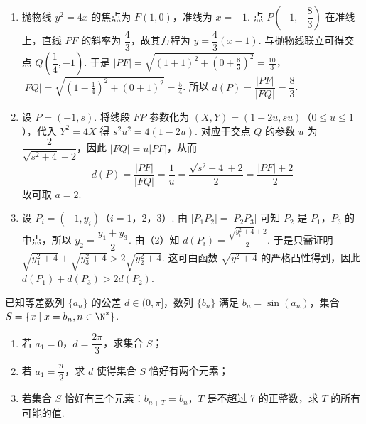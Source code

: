 \begin{solution}
\begin{enumerate}
\item 抛物线 \(y^2=4x\) 的焦点为 \(F(1,0)\)，准线为 \(x=-1\). 点 \(P\left(-1,-\dfrac83\right)\) 在准线上，直线 \(PF\) 的斜率为 \(\dfrac43\)，故其方程为 \(y=\dfrac43(x-1)\). 与抛物线联立可得交点 \(Q\left(\dfrac14,-1\right)\). 于是
\(|PF|=\sqrt{(1+1)^2+\left(0+\frac83\right)^2}=\frac{10}{3}\)，\(|FQ|=\sqrt{\left(1-\frac14\right)^2+(0+1)^2}=\frac54\).
所以 \(d(P)=\dfrac{|PF|}{|FQ|}=\dfrac83\).

\item 设 \(P=(-1,s)\). 将线段 \(FP\) 参数化为 \((X,Y)=(1-2u,su)\)（\(0\le u\le1\)），代入 \(Y^2=4X\) 得
\(s^2u^2=4(1-2u)\).
对应于交点 \(Q\) 的参数 \(u\) 为 \(\dfrac{2}{\sqrt{s^2+4}+2}\)，因此 \(|FQ|=u|PF|\)，从而
\[
d(P)=\frac{|PF|}{|FQ|}=\frac{1}{u}=\frac{\sqrt{s^2+4}+2}{2}=\frac{|PF|+2}{2}
\]
故可取 \(a=2\).

\item 设 \(P_i=(-1,y_i)\)（\(i=1\)，\(2\)，\(3\)）. 由 \(|P_1P_2|=|P_2P_3|\) 可知 \(P_2\) 是 \(P_1\)，\(P_3\) 的中点，所以 \(y_2=\dfrac{y_1+y_3}{2}\). 由（2）知
\(d(P_i)=\frac{\sqrt{y_i^2+4}+2}{2}\).
于是只需证明 \(\sqrt{y_1^2+4}+\sqrt{y_3^2+4}>2\sqrt{y_2^2+4}\). 这可由函数 \(\sqrt{y^2+4}\) 的严格凸性得到，因此
\(d(P_1)+d(P_3)>2d(P_2)\).
\end{enumerate}
\end{solution}

\begin{problem}
已知等差数列 \(\{a_n\}\) 的公差 \(d\in(0,\pi]\)，数列 \(\{b_n\}\) 满足 \(b_n=\sin(a_n)\)，集合 \(S=\{x\mid x=b_n,n\in\N^*\}\).

\begin{enumerate}
\item 若 \(a_1=0\)，\(d=\dfrac{2\pi}{3}\)，求集合 \(S\)；
\item 若 \(a_1=\dfrac{\pi}{2}\)，求 \(d\) 使得集合 \(S\) 恰好有两个元素；
\item 若集合 \(S\) 恰好有三个元素：\(b_{n+T}=b_n\)，\(T\) 是不超过 7 的正整数，求 \(T\) 的所有可能的值.
\end{enumerate}
\end{problem}

